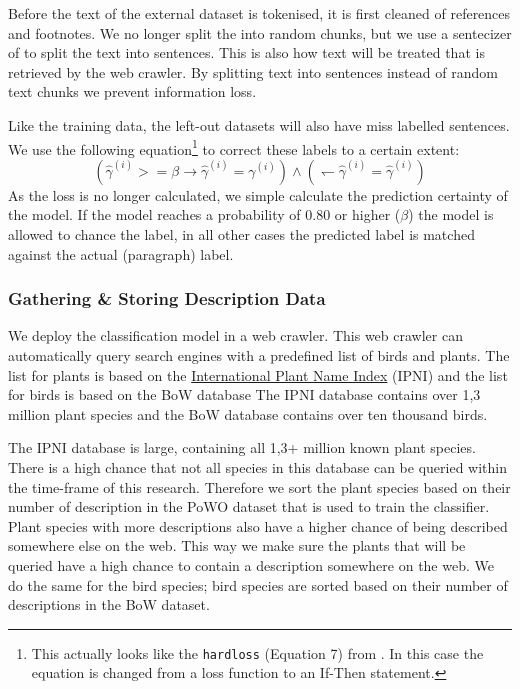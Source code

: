 \documentclass[a4paper, 12pt, oneside]{book} %
\begin{document}
Before the text of the external dataset is tokenised, it is first cleaned of references and footnotes.
We no longer split the into random chunks, but we use a sentecizer of \textcite{honnibal_spacy_2020} to split the text into sentences.
This is also how text will be treated that is retrieved by the web crawler.
By splitting text into sentences instead of random text chunks we prevent information loss.

Like the training data, the left-out datasets will also have miss labelled sentences.
We use the following equation\footnote{This actually looks like the \texttt{hardloss} (Equation 7) from \textcite{reed_training_2015}. In this case the equation is changed from a loss function to an If-Then statement.} to correct these labels to a certain extent:
\begin{equation} \label{eq:softloss_ifthen}
(\hat{\gamma}^{(i)} >= \beta \rightarrow \hat{\gamma}^{(i)} = \gamma^{(i)}) \wedge ( \leftharpoondown \hat{\gamma}^{(i)} = \hat{\gamma}^{(i)})
\end{equation}
As the loss is no longer calculated, we simple calculate the prediction certainty of the model.
If the model reaches a probability of 0.80 or higher (\(\beta\)) the model is allowed to chance the label, in all other cases the predicted label is matched against the actual (paragraph) label.


\subsubsection{Gathering \& Storing Description Data}
We deploy the classification model in a web crawler.
This web crawler can automatically query search engines with a predefined list of birds and plants.
The list for plants is based on the \href{https://www.ipni.org/}{International Plant Name Index} (IPNI) and the list for birds is based on the BoW database %
The IPNI database contains over 1,3 million plant species and the BoW database contains over ten thousand birds.

The IPNI database is large, containing all 1,3+ million known plant species.
There is a high chance that not all species in this database can be queried within the time-frame of this research.
Therefore we sort the plant species based on their number of description in the PoWO dataset that is used to train the classifier.
Plant species with more descriptions also have a higher chance of being described somewhere else on the web.
This way we make sure the plants that will be queried have a high chance to contain a description somewhere on the web.
We do the same for the bird species; bird species are sorted based on their number of descriptions in the BoW dataset.
\end{document}
